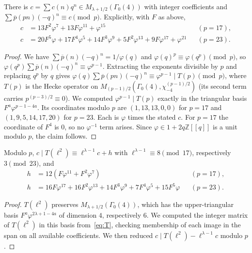 \documentclass[11pt]{article}
\theoremstyle{remark}\newtheorem{remark}[theorem]{Remark}
\newcommand{\pb}{\overline{p}}
\begin{document}
\begin{lemma}\label{lem:c}
There is $c=\sum c(n)q^n\in M_{\lambda+1/2}(\Gamma_0(4))$ with integer coefficients and $\sum\pb(pn)(-q)^n\equiv c\pmod p$. Explicitly, with $F$ as above,
\begin{align*}
c&=13F^2\varphi^7+13F\varphi^{11}+\varphi^{15} && (p=17),\\
c&=20F^5\varphi+17F^4\varphi^5+14F^3\varphi^9+5F^2\varphi^{13}+9F\varphi^{17}+\varphi^{21} && (p=23).
\end{align*}
\end{lemma}
\begin{proof}
We have $\sum\pb(n)(-q)^n=1/\varphi(q)$ and $\varphi(q)^p\equiv\varphi(q^p)\pmod p$, so $\varphi(q^p)\sum\pb(n)(-q)^n\equiv\varphi^{p-1}$. Extracting the exponents divisible by $p$ and replacing $q^p$ by $q$ gives $\varphi(q)\sum\pb(pn)(-q)^n\equiv\varphi^{p-1}\mid T(p)\pmod p$, where $T(p)$ is the Hecke operator on $M_{(p-1)/2}(\Gamma_0(4),\chi_{-4}^{(p-1)/2})$ (its second term carries $p^{(p-3)/2}\equiv0$). We computed $\varphi^{p-1}\mid T(p)$ exactly in the triangular basis $F^a\varphi^{p-1-4a}$. Its coordinates modulo $p$ are $(1,13,13,0,0)$ for $p=17$ and $(1,9,5,14,17,20)$ for $p=23$. Each is $\varphi$ times the stated $c$. For $p=17$ the coordinate of $F^4$ is $0$, so no $\varphi^{-1}$ term arises. Since $\varphi\in1+2q\mathbb Z[[q]]$ is a unit modulo $p$, the claim follows.
\end{proof}

\begin{proposition}\label{prop:h}
Modulo $p$, $c\mid T(\ell^2)\equiv\ell^{\lambda-1}c+h$ with $\ell^{\lambda-1}\equiv8\pmod{17}$, respectively $3\pmod{23}$, and
\begin{align*}
h&=12(F\varphi^{11}+F^2\varphi^7) && (p=17),\\
h&=16F\varphi^{17}+16F^2\varphi^{13}+14F^3\varphi^9+7F^4\varphi^5+15F^5\varphi && (p=23).
\end{align*}
\end{proposition}
\begin{proof}
$T(\ell^2)$ preserves $M_{\lambda+1/2}(\Gamma_0(4))$, which has the upper-triangular basis $F^a\varphi^{2\lambda+1-4a}$ of dimension $4$, respectively $6$. We computed the integer matrix of $T(\ell^2)$ in this basis from~\eqref{eq:T}, checking membership of each image in the span on all available coefficients. We then reduced $c\mid T(\ell^2)-\ell^{\lambda-1}c$ modulo $p$.
\end{proof}
\end{document}
